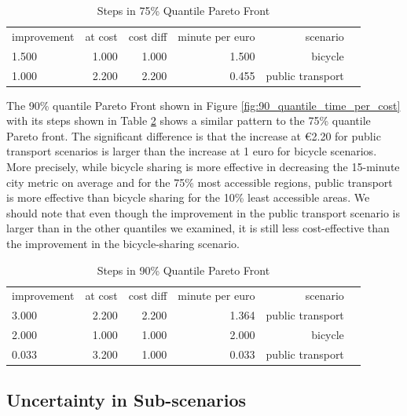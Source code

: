\begin{table}
  \caption{Steps in 75\% Quantile Pareto Front}
  \label{tab:differences_in_75_quantile_pareto_front}
  \begin{center}
    \begin{tabular}{lrrrrl}
     improvement & at cost & cost diff & minute per euro & scenario \\
     1.500 & 1.000 & 1.000 & 1.500 & bicycle \\
     1.000 & 2.200 & 2.200 & 0.455 & public transport \\
    \end{tabular}
  \end{center}
\end{table}


The 90\% quantile Pareto Front shown in Figure \ref{fig:90_quantile_time_per_cost} with its steps shown in Table \ref{tab:differences_in_90_quantile_pareto_front} shows a similar pattern to the 75\% quantile Pareto front.
The significant difference is that the increase at \euro{2.20} for public transport scenarios is larger than the increase at 1 euro for bicycle scenarios.
More precisely, while bicycle sharing is more effective in decreasing the 15-minute city metric on average and for the 75\% most accessible regions, public transport is more effective than bicycle sharing for the 10\% least accessible areas.
We should note that even though the improvement in the public transport scenario is larger than in the other quantiles we examined, it is still less cost-effective than the improvement in the bicycle-sharing scenario.


\begin{table}
  \caption{Steps in 90\% Quantile Pareto Front}
  \label{tab:differences_in_90_quantile_pareto_front}
  \begin{center}
    \begin{tabular}{lrrrrl}
     improvement & at cost & cost diff & minute per euro & scenario \\
     3.000 & 2.200 & 2.200 & 1.364 & public transport \\
     2.000 & 1.000 & 1.000 & 2.000 & bicycle \\
     0.033 & 3.200 & 1.000 & 0.033 & public transport \\
    \end{tabular}
  \end{center}
\end{table}


\subsection{Uncertainty in Sub-scenarios}
\label{subsec:uncertainty_subscenarios}

